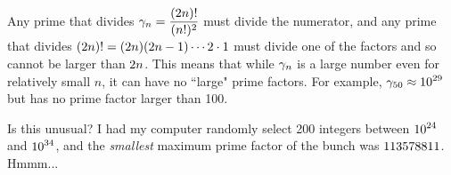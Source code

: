 Any prime that divides $\displaystyle \gamma_n = \frac{(2n)!}{(n!)^2}$ must divide the numerator, and any prime that divides $\displaystyle (2n)! = (2n)(2n-1)\cdots 2\cdot 1$ must divide one of the factors and so cannot be larger than $\displaystyle 2n$. This means that while $\displaystyle \gamma_n$ is a large number even for relatively small $n$, it can have no ``large" prime factors. For example, $\displaystyle \gamma_{50} \approx 10^{29}$ but has no prime factor larger than 100.

Is this unusual? I had my computer randomly select 200 integers between $\displaystyle 10^{24}$ and $\displaystyle 10^{34}$, and the \textit{smallest} maximum prime factor of the bunch was $\displaystyle 113578811$. Hmmm...


